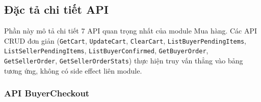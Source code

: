 \subsection{Đặc tả chi tiết API}
\label{subsec:order-api-detail}

Phần này mô tả chi tiết 7 API quan trọng nhất của module Mua hàng.
Các API CRUD đơn giản (\texttt{GetCart}, \texttt{UpdateCart}, \texttt{ClearCart}, \texttt{ListBuyerPendingItems}, \texttt{ListSellerPendingItems}, \texttt{ListBuyerConfirmed}, \texttt{GetBuyerOrder}, \texttt{GetSellerOrder}, \texttt{GetSellerOrderStats}) thực hiện truy vấn thẳng vào bảng tương ứng, không có side effect liên module.

\subsubsection{API BuyerCheckout}

